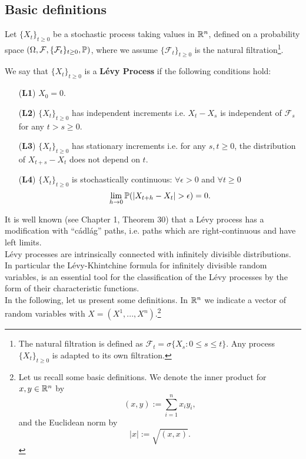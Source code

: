 \subsection{Basic definitions}

Let $\{X_t\}_{t \ge 0}$ be a stochastic process taking values in $\mathbb{R}^n$,
defined on a probability space $(\Omega,\mathcal{F},\{\mathcal{F}_t\}_{t \ge 0},\mathbb{P})$,
where we assume $\{\mathcal{F}_t\}_{t \ge 0}$ is the natural filtration\footnote{The natural filtration is defined as $\mathcal{F}_{t} = \sigma\{X_s :
0\leq s \leq t\} $. Any process $\{X_t\}_{t \geq 0}$ is adapted to its own filtration.}.\\ 
\begin{Definition}\label{LevyDef}
We say that $\{X_t\}_{t \ge 0}$ is a \textbf{Lévy Process} if the following conditions hold:
\begin{itemize}
 \item[(\textbf{L1})] $X_{0} = 0$.
 \item[(\textbf{L2})] $\{X_t\}_{t \ge 0}$ has independent increments i.e. $X_t - X_s$ is independent of $\mathcal{F}_s$ for any $t > s \geq 0$.
 \item[(\textbf{L3})] $\{X_t\}_{t \ge 0}$ has stationary increments i.e. for any $s,t \geq 0$, the distribution of $X_{t+s} - X_t$ does not depend on $t$.  
 \item[(\textbf{L4})] $\{X_t\}_{t \ge 0}$ is stochastically continuous: $\forall \epsilon > 0 $ and $\forall t \ge 0$  $$\lim_{h\to 0} \mathbb{P}(|X_{t+h}-X_t| > \epsilon)=0. $$ 
\end{itemize}
\end{Definition}
It is well known (see \cite{Protter} Chapter 1, Theorem 30) that a Lévy process has a modification with ``cádlág''
paths, i.e. paths which are right-continuous and have left limits. \\
Lévy processes are intrinsically connected with infinitely divisible distributions. In particular the Lévy-Khintchine formula 
for infinitely divisible random variables, is an essential tool for the classification of the Lévy processes by the form of their
characteristic functions.\\
In the following, let us present some definitions. In $\mathbb{R}^n$ we indicate a vector of random variables with $X = (X^1, ..., X^n)$.\footnote{ 
Let us recall some basic definitions. We denote the inner product for $x,y \in \mathbb{R}^n$ by
$$(x,y) := \sum_{i=1}^n x_i y_i ,$$ and the Euclidean norm by $$|x| := \sqrt{(x,x)}.$$ }

